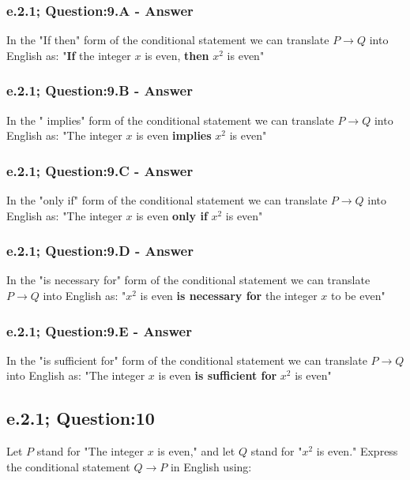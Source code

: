 \subsubsection*{e.2.1; Question:9.A - Answer}
In the "If then" form of the conditional statement we can translate $P \to Q$ into English as: "{\bf If} the integer $x$ is even, {\bf then} $x^2$ is even" \\


\subsubsection*{e.2.1; Question:9.B - Answer}
In the " implies" form of the conditional statement we can translate $P \to Q$ into English as: "The integer $x$ is even {\bf implies} $x^2$ is even" \\


\subsubsection*{e.2.1; Question:9.C - Answer}
In the "only if" form of the conditional statement we can translate $P \to Q$ into English as: "The integer $x$ is even {\bf only if} $x^2$ is even" \\

\subsubsection*{e.2.1; Question:9.D - Answer}
In the "is necessary for" form of the conditional statement we can translate $P \to Q$ into English as: "$x^2$ is even {\bf is necessary for} the integer $x$ to be even" \\

\subsubsection*{e.2.1; Question:9.E - Answer}
In the "is sufficient for" form of the conditional statement we can translate $P \to Q$ into English as: "The integer $x$ is even {\bf is sufficient for} $x^2$ is even" \\



\newpage
\subsection{e.2.1; Question:10}
Let $P$ stand for "The integer $x$ is even," and let $Q$ stand for "$x^2$ is even." Express the conditional statement $Q \to P$ in English using: \\


